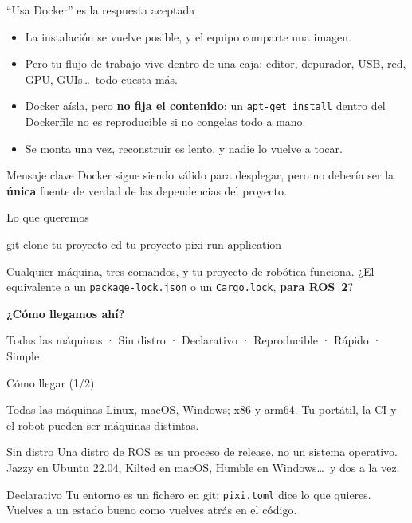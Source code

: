 \documentclass[aspectratio=169]{beamer}
\newcommand{\separador}[2]{%
\begin{frame}
  \centering
  \vfill
  {\usebeamercolor[fg]{structure}\fontsize{34}{40}\selectfont\bfseries #1\par}
  \vspace{1.2em}
  {\Large\color{halfgray} #2\par}
  \vfill
\end{frame}%
}
\begin{document}
\begin{frame}{``Usa Docker'' es la respuesta aceptada}
\begin{itemize}
    \item La instalación se vuelve posible, y el equipo comparte una imagen.
    \item Pero tu flujo de trabajo vive dentro de una caja: editor, depurador, USB, red, GPU, GUIs\ldots\ todo cuesta más.
    \item Docker aísla, pero \textbf{no fija el contenido}: un \lstinline|apt-get install| dentro del Dockerfile no es reproducible si no congelas todo a mano.
    \item Se monta una vez, reconstruir es lento, y nadie lo vuelve a tocar.
\end{itemize}
\vfill
\begin{alertblock}{Mensaje clave}
Docker sigue siendo válido para desplegar, pero no debería ser la \textbf{única} fuente de verdad de las dependencias del proyecto.
\end{alertblock}
\end{frame}

\begin{frame}[fragile]{Lo que queremos}
\vfill
\begin{terminal}
git clone tu-proyecto
cd tu-proyecto
pixi run application
\end{terminal}
\vfill
\centering \Large Cualquier máquina, tres comandos, y tu proyecto de robótica funciona.
\vfill
\normalsize ¿El equivalente a un \lstinline|package-lock.json| o un \lstinline|Cargo.lock|, \textbf{para ROS~2}?
\vfill
\end{frame}

\separador{¿Cómo llegamos ahí?}{Todas las máquinas · Sin distro · Declarativo · Reproducible · Rápido · Simple}

\begin{frame}{Cómo llegar (1/2)}
\begin{block}{Todas las máquinas}
Linux, macOS, Windows; x86 y arm64. Tu portátil, la CI y el robot pueden ser máquinas distintas.
\end{block}
\begin{block}{Sin distro}
Una distro de ROS es un proceso de release, no un sistema operativo. Jazzy en Ubuntu 22.04, Kilted en macOS, Humble en Windows\ldots\ y dos a la vez.
\end{block}
\begin{block}{Declarativo}
Tu entorno es un fichero en git: \lstinline|pixi.toml| dice lo que quieres. Vuelves a un estado bueno como vuelves atrás en el código.
\end{block}
\end{frame}
\end{document}
